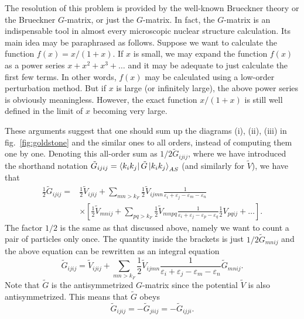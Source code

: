 The resolution of this problem is provided by the well-known
Brueckner theory or the Brueckner $G$-matrix, or just the
$G$-matrix. In fact, the $G$-matrix is an indispensable
tool in almost every microscopic nuclear structure
calculation. Its main idea may be paraphrased as follows.
Suppose we want to calculate the function $f(x)=x/(1+x)$. If
$x$ is small, we may expand the function $f(x)$ as a power series
$x+x^2+x^3+\dots$ and it may be adequate to just calculate the first
few terms. In other words, $f(x)$ may be calculated using a low-order
perturbation method. But if $x$ is large
(or infinitely large), the above
power series is obviously meaningless.
However, the exact function
$x/(1+x)$ is still well defined in the limit
of $x$ becoming very large.

These arguments suggest that one should sum up the diagrams
(i), (ii), (iii) in fig.\ \ref{fig:goldstone} and the similar ones
to all orders, instead of computing them one by one. Denoting this
all-order sum as $1/2\tilde{G}_{ijij}$, where we have
introduced the shorthand notation
$\tilde{G}_{ijij}=\left\langle k_ik_j \right|\tilde{G}\left| k_ik_j \right\rangle_{AS}$
(and similarly for $\tilde{V}$),
we have that
\begin{eqnarray}
      \frac{1}{2}\tilde{G}_{ijij}=&{\displaystyle
      \frac{1}{2}\tilde{V}_{ijij}
      +\sum_{mn>k_F}\frac{1}{2}\tilde{V}_{ijmn}\frac{1}
      {\varepsilon_i+\varepsilon_j-\varepsilon_m-\varepsilon_n}}
      \nonumber \\
      &{\displaystyle \times\left[\frac{1}{2}\tilde{V}_{mnij}+\sum_{pq>k_F}
      \frac{1}{2}\tilde{V}_{mnpq}\frac{1}
      {\varepsilon_i+\varepsilon_j-\varepsilon_p-\varepsilon_q}
      \frac{1}{2}V_{pqij}+\dots  \right] }.
\end{eqnarray}
The factor $1/2$ is the same as that discussed above, namely we want 
to count a pair of particles only once.
The quantity inside the brackets is just
$1/2\tilde{G}_{mnij}$ and the above equation can be
rewritten as an integral equation
\begin{equation}
      \tilde{G}_{ijij}=\tilde{V}_{ijij}
      +\sum_{mn>k_F}\frac{1}{2}\tilde{V}_{ijmn}\frac{1}
      {\varepsilon_i+\varepsilon_j-\varepsilon_m-\varepsilon_n}
      \tilde{G}_{mnij}.
\end{equation}
Note that $\tilde{G}$ is the antisymmetrized $G$-matrix since
the potential $\tilde{V}$ is also antisymmetrized. This means that
$\tilde{G}$ obeys
\begin{equation}
  \tilde{G}_{ijij}=-\tilde{G}_{jiij}=-\tilde{G}_{ijji}.
\end{equation}
